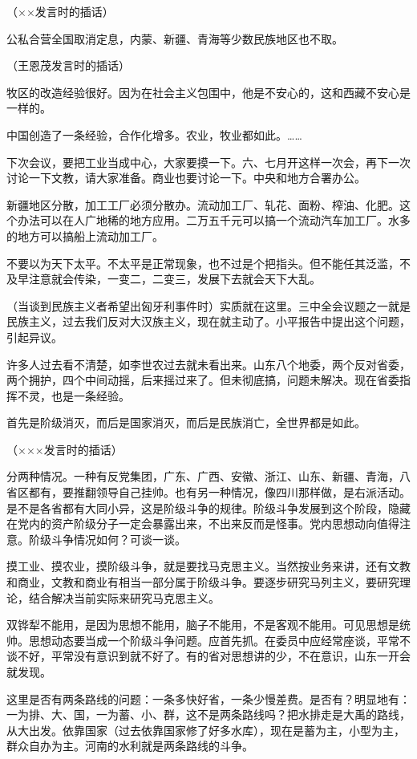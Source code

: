 （××发言时的插话）

公私合营全国取消定息，内蒙、新疆、青海等少数民族地区也不取。

（王恩茂发言时的插话）

牧区的改造经验很好。因为在社会主义包围中，他是不安心的，这和西藏不安心是一样的。

中国创造了一条经验，合作化增多。农业，牧业都如此。……

下次会议，要把工业当成中心，大家要摸一下。六、七月开这样一次会，再下一次讨论一下文教，请大家准备。商业也要讨论一下。中央和地方合署办公。

新疆地区分散，加工工厂必须分散办。流动加工厂、轧花、面粉、榨油、化肥。这个办法可以在人广地稀的地方应用。二万五千元可以搞一个流动汽车加工厂。水多的地方可以搞船上流动加工厂。

不要以为天下太平。不太平是正常现象，也不过是个把指头。但不能任其泛滥，不及早注意就会传染，一变二，二变三，发展下去就会天下大乱。

（当谈到民族主义者希望出匈牙利事件时）实质就在这里。三中全会议题之一就是民族主义，过去我们反对大汉族主义，现在就主动了。小平报告中提出这个问题，引起异议。

许多人过去看不清楚，如李世农过去就未看出来。山东八个地委，两个反对省委，两个拥护，四个中间动摇，后来摇过来了。但未彻底搞，问题未解决。现在省委指挥不灵，也是一条经验。

首先是阶级消灭，而后是国家消灭，而后是民族消亡，全世界都是如此。

（×××发言时的插话）

分两种情况。一种有反党集团，广东、广西、安徽、浙江、山东、新疆、青海，八省区都有，要推翻领导自己挂帅。也有另一种情况，像四川那样做，是右派活动。是不是各省都有大同小异，这是阶级斗争的规律。阶级斗争发展到这个阶段，隐藏在党内的资产阶级分子一定会暴露出来，不出来反而是怪事。党内思想动向值得注意。阶级斗争情况如何？可谈一谈。

摸工业、摸农业，摸阶级斗争，就是要找马克思主义。当然按业务来讲，还有文教和商业，文教和商业有相当一部分属于阶级斗争。要逐步研究马列主义，要研究理论，结合解决当前实际来研究马克思主义。

双铧犁不能用，是因为思想不能用，脑子不能用，不是客观不能用。可见思想是统帅。思想动态要当成一个阶级斗争问题。应首先抓。在委员中应经常座谈，平常不谈不好，平常没有意识到就不好了。有的省对思想讲的少，不在意识，山东一开会就发现。

这里是否有两条路线的问题：一条多快好省，一条少慢差费。是否有？明显地有：一为排、大、国，一为蓄、小、群，这不是两条路线吗？把水排走是大禹的路线，从大出发。依靠国家（过去依靠国家修了好多水库），现在是蓄为主，小型为主，群众自办为主。河南的水利就是两条路线的斗争。

